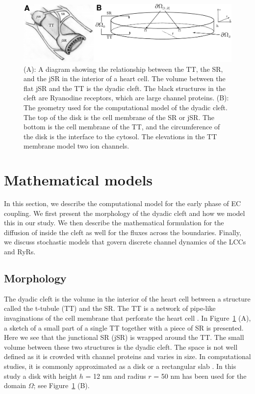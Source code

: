 \begin{figure}
\label{fig:hake:morphology}
  \center
  \includegraphics[width=\largefig]{chapters/hake/pdf/morphology}
  \caption[The dyadic cleft]{(A): A diagram showing the
    relationship between the TT, the SR, and the jSR in the interior
    of a heart cell. The volume between the flat jSR and the TT is the
    dyadic cleft. The black structures in the cleft are Ryanodine
    receptors, which are large channel proteins. (B): The
    geometry used for the computational model of the dyadic cleft. The
    top of the disk is the cell membrane of the SR or jSR. The bottom
    is the cell membrane of the TT, and the circumference of the disk
    is the interface to the cytosol. The elevations in the TT membrane
    model two \Ca ion channels.}
\end{figure}

\section{Mathematical models}
\label{sec:hake:mathematical-models}

In this section, we describe the computational model for the early
phase of EC coupling. We first present the morphology of the dyadic
cleft and how we model this in our study. We then describe the
mathematical formulation for the diffusion of \Ca inside the cleft as
well for the \Ca fluxes across the boundaries. Finally, we discuss
stochastic models that govern discrete channel dynamics of the LCCs
and RyRs.

\subsection{Morphology}
\label{sec:hake:morphology}
  

The dyadic cleft is the volume in the interior of the heart cell
between a structure called the t-tubule (TT) and the SR. The TT is a
network of pipe-like invaginations of the cell membrane that perforate
the heart cell \citep{SoellerCannell1999}. In
Figure~\ref{fig:hake:morphology} (A), a sketch of a small part of
a single TT together with a piece of SR is presented. Here we see that
the junctional SR (jSR) is wrapped around the TT. The small volume
between these two structures is the dyadic cleft. The space is not
well defined as it is crowded with channel proteins and varies in
size. In computational studies, it is commonly approximated as a disk
or a rectangular slab
\citep{PeskoffPostLanger1992,SoellerCannell1997,KohSrinivasanChingEtAl2006,
  TanskanenGreensteinChenEtAl2007}. In this study a disk with height
$h$ = 12 nm and radius $r$ = 50 nm has been used for the domain
$\Omega$; see Figure~\ref{fig:hake:morphology} (B).

